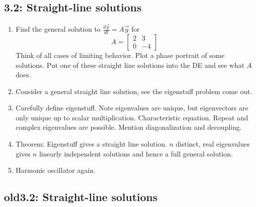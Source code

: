 \documentclass{article}
\begin{document}
\subsection{3.2: Straight-line solutions}	
\begin{enumerate}
\item Find the general solution to $\frac{d \vec{y}}{dt} = A \vec{y}$ for 
\[
A = \begin{bmatrix}
2 & 3 \\ 0 & -4
\end{bmatrix}
\]
Think of all cases of limiting behavior. Plot a phase portrait of some solutions. Put one of these straight line solutions into the DE and see what $A$ does.
\item Consider a general straight line solution, see the eigenstuff problem come out.
\item Carefully define eigenstuff. Note eigenvalues are unique, but eigenvectors are only unique up to scalar multiplication. Characteristic equation. Repeat and complex eigenvalues are possible. Mention diagonalization and decoupling.
\item Theorem: Eigenstuff gives a straight line solution. $n$ distinct, real eigenvalues gives $n$ linearly independent solutions and hence a full general solution.
\item Harmonic oscillator again.
\end{enumerate}

\subsection{old3.2: Straight-line solutions}	
\end{document}
